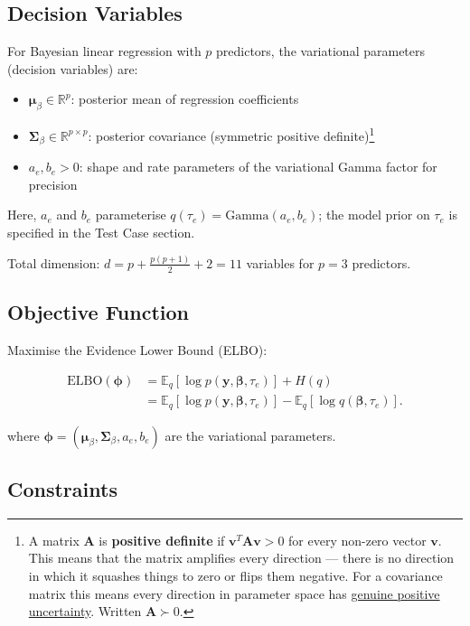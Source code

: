 \documentclass[11pt,a4paper]{article}
\newcommand{\E}{\mathbb{E}}
\newcommand{\R}{\mathbb{R}}
\newcommand{\ELBO}{\text{ELBO}}
\begin{document}
\subsection*{Decision Variables}

For Bayesian linear regression with $p$ predictors, the variational parameters (decision variables) are:
\begin{itemize}
\item $\bm{\mu}_\beta \in \R^p$: posterior mean of regression coefficients
\item $\bm{\Sigma}_\beta \in \R^{p \times p}$: posterior covariance 
(symmetric positive definite)\footnote{A matrix $\bm{A}$ is \textbf{positive definite} 
if $\bm{v}^T\bm{A}\bm{v} > 0$ for every non-zero vector $\bm{v}$. This means that the matrix amplifies every 
direction --- there is no direction in which it squashes things to zero or flips them negative. For a
 covariance matrix this means every direction in parameter space has \underline{genuine positive uncertainty}. 
 Written $\bm{A} \succ 0$.}
\item $a_e, b_e > 0$: shape and rate parameters of the variational Gamma factor for precision
\end{itemize}

Here, $a_e$ and $b_e$ parameterise $q(\tau_e)=\mathrm{Gamma}(a_e,b_e)$; 
the model prior on $\tau_e$ is specified in the Test Case section.  \vspace{1em} 

Total dimension: $d = p + \frac{p(p+1)}{2} + 2 = 11$ variables for $p=3$ predictors.

\subsection*{Objective Function}

Maximise the Evidence Lower Bound (ELBO):

\begin{align}
\ELBO(\bm{\phi})
&= \E_q[\log p(\bm{y}, \bm{\beta}, \tau_e)] + H(q) \\
&= \E_q[\log p(\bm{y}, \bm{\beta}, \tau_e)] - \E_q[\log q(\bm{\beta}, \tau_e)] .
\end{align}

where $\bm{\phi} = (\bm{\mu}_\beta, \bm{\Sigma}_\beta, a_e, b_e)$ are the variational parameters.

\subsection*{Constraints}
\end{document}
